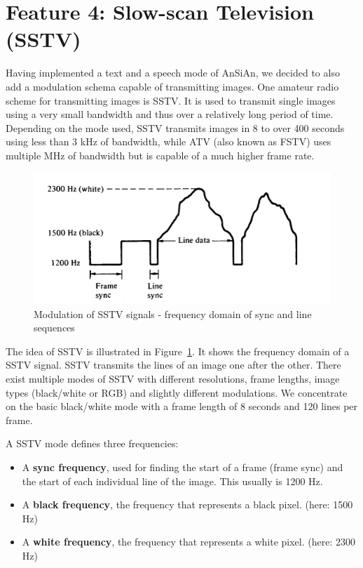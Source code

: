 \section{Feature 4: Slow-scan Television (SSTV)}
\label{sec:impl:sstv}
Having implemented a text and a speech mode of AnSiAn, we decided to also add a modulation schema capable of transmitting images. One amateur radio scheme for transmitting images is \ac{SSTV}. It is used to transmit single images using a very small bandwidth and thus over a relatively long period of time. Depending on the mode used, SSTV transmits images in 8 to over 400 seconds using less than 3 kHz of bandwidth, while \ac{ATV} (also known as \ac{FSTV}) uses multiple MHz of bandwidth but is capable of a much higher frame rate. 
\begin{figure}
	\centering
	\includegraphics[width=\linewidth]{gfx/sstv_intro.png}
	\caption{Modulation of \ac{SSTV}  signals - frequency domain of sync and line sequences \cite[p. 239]{pritchard2016newnes}}
	\label{fig:impl:sstv:intro}
\end{figure}

The idea of \ac{SSTV} is illustrated in Figure~\ref{fig:impl:sstv:intro}. It shows the frequency domain of a SSTV signal. SSTV transmits the lines of an image one after the other. There exist multiple modes of SSTV with different resolutions, frame lengths, image types (black/white or RGB) and slightly different modulations. We concentrate on the basic black/white mode with a frame length of 8 seconds and 120 lines per frame.  

A SSTV mode defines three frequencies: 

\begin{itemize}
	\item A \textbf{sync frequency}, used for finding the start of a frame (frame sync) and the start of each individual line of the image. This usually is 1200 Hz. 
	\item A \textbf{black frequency}, the frequency that represents a black pixel. (here: 1500 Hz)
	\item A \textbf{white frequency}, the frequency that represents a white pixel. (here: 2300 Hz)
\end{itemize}

